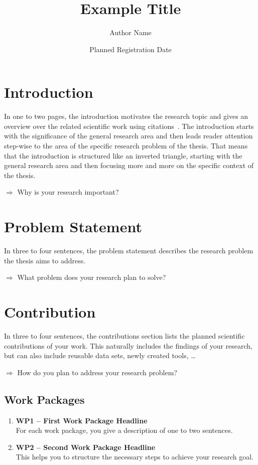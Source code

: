 \documentclass[10pt,a4paper,oneside]{article}
\title{Example Title}
\author{Author Name}
\date{Planned Registration Date}
\begin{document}
	\maketitle

	\section{Introduction}
	In one to two pages, the introduction motivates the research topic and gives an overview over the related scientific work using citations~\cite{TBK:ICSE09}.
	The introduction starts with the significance of the  general research area and then leads reader attention step-wise to the area of the specific research problem of the thesis.
	That means that the introduction is structured like an inverted triangle, starting with the general research area and then focusing more and more on the specific context of the thesis.

	$\Rightarrow$ Why is your research important?
	
	\section{Problem Statement}
	In three to four sentences, the problem statement describes the research problem the thesis aims to address.

	$\Rightarrow$ What problem does your research plan to solve?

	\section{Contribution}
	In three to four sentences, the contributions section lists the planned scientific contributions of your work.
	This naturally includes the findings of your research, but can also include reusable data sets, newly created tools, \dots

	$\Rightarrow$ How do you plan to address your research problem?

	\subsection{Work Packages}
	
	\begin{enumerate}
		\item \textbf{WP1 -- First Work Package Headline}\\
			For each work package, you give a description of one to two sentences.
		\item \textbf{WP2 -- Second Work Package Headline}\\
			This helps you to structure the necessary steps to achieve your research goal.
	\end{enumerate}
\end{document}
